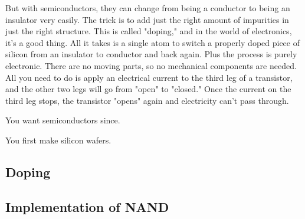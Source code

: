   But with semiconductors, they can change from being a conductor to being an insulator very easily. The trick is to add just the right amount of impurities in just the right structure. This is called "doping," and in the world of electronics, it's a good thing. All it takes is a single atom to switch a properly doped piece of silicon from an insulator to conductor and back again. Plus the process is purely electronic. There are no moving parts, so no mechanical components are needed. All you need to do is apply an electrical current to the third leg of a transistor, and the other two legs will go from "open" to "closed." Once the current on the third leg stops, the transistor "opens" again and electricity can't pass through. 

  You want semiconductors since. 

  You first make silicon wafers. 

\subsection{Doping}

\subsection{Implementation of NAND} 


